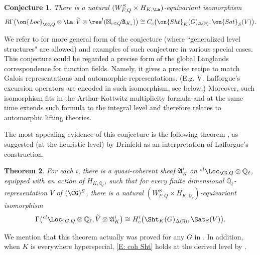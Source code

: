 \documentclass[11pt]{amsart}
\newtheorem{thm}{Theorem}[subsection]
\newtheorem{conjecture}[thm]{Conjecture}
\theoremstyle{definition}
\theoremstyle{definition}
\theoremstyle{definition}
\numberwithin{equation}{section}
\newcommand{\frakA}{{\mathfrak A}}
\newcommand{\bQ}{{\mathbb Q}}
\begin{document}
\begin{conjecture}\label{C: gen coh}
There is a natural $(W_{F,Q}^S\times H_{K,\La})$-equivariant isomorphism
\[
R\Gamma\bigl(\on{Loc}_{\CG,Q}\otimes\La, \widetilde{V}\otimes  \res^!(\boxtimes_{v\in Q} \frakA_{K_v})\bigr)\cong C_c\bigl(\on{Sht}_K(G)_{\Delta(\overline\eta)}, \on{Sat}_S(V)\bigr).
\]
\end{conjecture}

We refer to \cite[Sect. 4.7]{Zhu-Conjecture} for more general form of the conjecture (where ``generalized level structures" are allowed) and examples of such conjecture in various special cases. This conjecture could be regarded a precise form of the global Langlands correspondence for function fields. Namely, it gives a precise recipe to match Galois representations and automorphic representations. (E.g. V. Lafforgue's excursion operators are encoded in such isomorphism, see below.)
Moreover, such isomorphism fits in the Arthur-Kottwitz multiplicity formula and at the same time extends such formula to the integral level and therefore relates to automorphic lifting theories. 

The most appealing evidence of this conjecture is the following theorem \cite{Lafforgue-Zhu-Elliptic, Zhu-Conjecture}, as suggested (at the heuristic level) by Drinfeld as an interpretation of Lafforgue's construction. 

\begin{thm}\label{T: gen LZ}
For each $i$, there is a quasi-coherent sheaf $\frakA^i_K$ on ${}^{cl}\Loc_{\CG,Q}\otimes\bQ_\ell$, equipped with an action of $H_{K,\bQ_\ell}$, such that for every finite dimensional $\bQ_\ell$-representation $V$ of $(\CG)^S$, there is a natural $(W_{F,Q}^S\times H_{K,\bQ_\ell})$-equivariant isomorphism
\begin{equation*}\label{E: coh Sht}
\Gamma\big({}^{cl}\Loc_{{}^cG,Q}\otimes\bQ_\ell,\widetilde V\otimes \frakA^i_K\big)\cong H^i_c\bigl(\Sht_K(G)_{\Delta(\overline\eta)},\Sat_S(V)\bigr).
\end{equation*}
\end{thm}
We mention that this theorem actually was proved for any $G$ in \cite{Lafforgue-Zhu-Elliptic, Zhu-Conjecture}. In addition, when $K$ is everywhere hyperspecial, \eqref{E: coh Sht} holds at the derived level by \cite{AGKRRV}.
 
\end{document}
